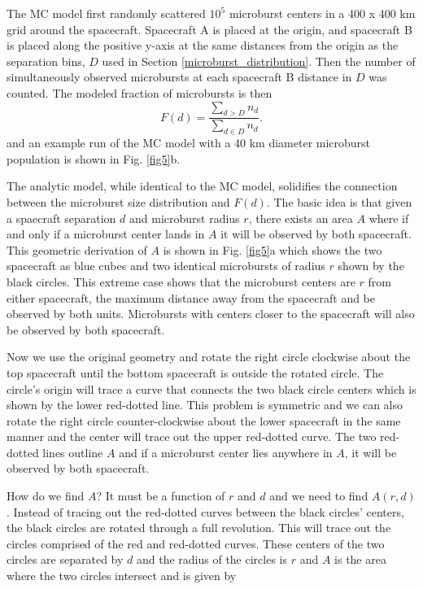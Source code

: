 \documentclass[draft]{agujournal2019}
\begin{document}
The MC model first randomly scattered $10^5$ microburst centers in a 400 x 400 km grid around the spacecraft. Spacecraft A is placed at the origin, and spacecraft B is placed along the positive y-axis at the same distances from the origin as the separation bins, $D$ used in Section \ref{microburst_distribution}. Then the number of simultaneously observed microbursts at each spacecraft B distance in $D$ was counted. The modeled fraction of microbursts is then
\begin{equation}
F(d) = \frac{\sum_{d > D} n_{d} }{\sum_{d \in D} n_{d}}.
\end{equation} and an example run of the MC model with a 40 km diameter microburst population is shown in Fig. \ref{fig5}b.

The analytic model, while identical to the MC model, solidifies the connection between the microburst size distribution and $F(d)$. The basic idea is that given a spaecraft separation $d$ and microburst radius $r$, there exists an area $A$ where if and only if a microburst center lands in $A$ it will be observed by both spacecraft. This geometric derivation of $A$ is shown in Fig. \ref{fig5}a which shows the two spacecraft as blue cubes and two identical microbursts of radius $r$ shown by the black circles. This extreme case shows that the microburst centers are $r$ from either spacecraft, the maximum distance away from the spacecraft and be observed by both units. Microbursts with centers closer to the spacecraft will also be observed by both spacecraft. 

Now we use the original geometry and rotate the right circle clockwise about the top spacecraft until the bottom spacecraft is outside the rotated circle. The circle's origin will trace a curve that connects the two black circle centers which is shown by the lower red-dotted line. This problem is symmetric and we can also rotate the right circle counter-clockwise about the lower spacecraft in the same manner and the center will trace out the upper red-dotted curve. The two red-dotted lines outline $A$ and if a microburst center lies anywhere in $A$, it will be observed by both spacecraft. 

How do we find $A$? It must be a function of $r$ and $d$ and we need to find $A(r, d)$. Instead of tracing out the red-dotted curves between the black circles' centers, the black circles are rotated through a full revolution. This will trace out the circles comprised of the red and red-dotted curves. These centers of the two circles are separated by $d$ and the radius of the circles is $r$ and $A$ is the area where the two circles intersect and is given by 
\end{document}
